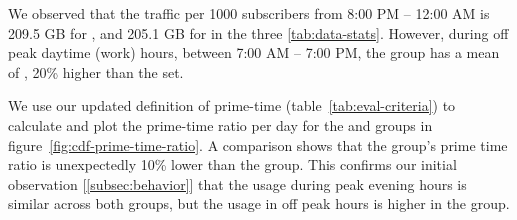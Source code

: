 We observed that the traffic per 1000 subscribers from 8:00 PM -- 12:00 AM is 
209.5 GB for \treatment{}, and 205.1 GB for \control{} in the three \ref{tab:data-stats}.
However, during off peak 
daytime (work) hours, between 7:00 AM -- 7:00 PM, the \treatment{} group has a 
mean of , 20\% higher than the \control{} set.

We use our updated definition of prime-time (table~\ref{tab:eval-criteria}) 
to calculate and plot the prime-time ratio per day for the \treatment{} and
\control{} groups in figure~\ref{fig:cdf-prime-time-ratio}. A comparison shows 
that
the \treatment{} group's prime time ratio is unexpectedly 10\% lower than the 
\control{} group. This confirms our initial observation 
[\autoref{subsec:behavior}]
that the usage during peak evening hours is similar across both groups, but the
usage in off peak hours is higher in the \treatment{} group.


